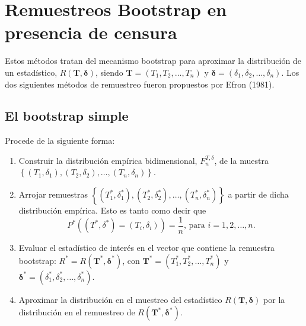 \documentclass[
]{book}
\renewcommand{\boldsymbol}[1]{\symbf{#1}}
\renewcommand{\mathbf}[1]{\symbf{#1}}
\theoremstyle{break}
\theoremstyle{nonumberplain}
\begin{document}
\section{Remuestreos Bootstrap en presencia de censura}\label{remuestreos-bootstrap-en-presencia-de-censura}

Estos métodos tratan del mecanismo bootstrap para aproximar la
distribución de un estadístico, \(R\left( \mathbf{T},
\boldsymbol{\delta} \right)\), siendo \(\mathbf{T}=\left( T_1, T_2,
\ldots,T_n \right)\) y \(\boldsymbol{\delta}=\left( \delta _1,\delta_2,
\ldots ,\delta _n \right)\). Los dos siguientes métodos de
remuestreo fueron propuestos por Efron (1981).

\subsection{El bootstrap simple}\label{el-bootstrap-simple}

Procede de la siguiente forma:

\begin{enumerate}
\def\labelenumi{\arabic{enumi}.}
\item
  Construir la distribución empírica bidimensional,
  \(F_n^{T,\delta }\), de la muestra
  \(\left\{ \left( T_1,\delta _1 \right), \left( T_2,\delta _2 \right), \ldots,
  \left( T_n,\delta _n \right) \right\}\).
\item
  Arrojar remuestras \(\left\{ \left( T_1^{\ast},\delta _1^{\ast} \right),
  \left( T_2^{\ast},\delta _2^{\ast} \right), \ldots,
  \left( T_n^{\ast},\delta _n^{\ast} \right) \right\}\)
  a partir de dicha distribución empírica. Esto es tanto como decir
  que\[P^{\ast}\left( \left( T^{\ast},\delta^{\ast} \right) =\left( T_i,\delta
  _i \right) \right) =\frac{1}{n}\text{, para }i=1,2,\ldots ,n\text{.}\]
\item
  Evaluar el estadístico de interés en el vector que contiene la
  remuestra bootstrap: \(R^{\ast}=R\left( \mathbf{T}^{\ast},
  \boldsymbol{\delta}^{\ast} \right)\), con
  \(\mathbf{T}^{\ast} = \left( T_1^{\ast},T_2^{\ast},\ldots ,T_n^{\ast} \right)\)
  y \(\boldsymbol{\delta}^{\ast} = \left( \delta_1^{\ast},\delta_2^{\ast},
  \ldots, \delta_n^{\ast} \right)\).
\item
  Aproximar la distribución en el muestreo del estadístico
  \(R\left( \mathbf{T}, \boldsymbol{\delta} \right)\) por la
  distribución en el remuestreo de \(R\left(
  \mathbf{T}^{\ast},\boldsymbol{\delta}^{\ast} \right)\).
\end{enumerate}
\end{document}
